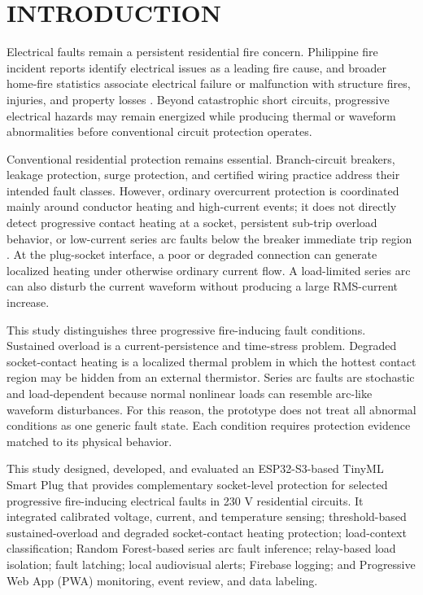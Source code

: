 \documentclass[conference,a4paper]{template/IEEEtran}
\begin{document}
\section{INTRODUCTION}

Electrical faults remain a persistent residential fire concern. Philippine
fire incident reports identify electrical issues as a leading fire cause,
and broader home-fire statistics associate electrical failure or malfunction
with structure fires, injuries, and property losses
\cite{gma-bfp,nfpa-electrical}. Beyond catastrophic short circuits,
progressive electrical hazards may remain energized while producing thermal
or waveform abnormalities before conventional circuit protection operates.

Conventional residential protection remains essential. Branch-circuit
breakers, leakage protection, surge protection, and certified wiring
practice address their intended fault classes. However, ordinary
overcurrent protection is coordinated mainly around conductor heating and
high-current events; it does not directly detect progressive contact heating
at a socket, persistent sub-trip overload behavior, or low-current series
arc faults below the breaker immediate trip region
\cite{schneider-inverse,bal-pvc,lee-afci}. At the
plug-socket interface, a poor or degraded connection can generate localized
heating under otherwise ordinary current flow. A load-limited series arc can
also disturb the current waveform without producing a large RMS-current
increase.

This study distinguishes three progressive fire-inducing fault conditions.
Sustained overload is a current-persistence and time-stress problem.
Degraded socket-contact heating is a localized thermal problem in which the
hottest contact region may be hidden from an external thermistor. Series
arc faults are stochastic and load-dependent because normal nonlinear loads
can resemble arc-like waveform disturbances. For this reason, the prototype
does not treat all abnormal conditions as one generic fault state. Each
condition requires protection evidence matched to its physical behavior.

This study designed, developed, and evaluated an
ESP32-S3-based TinyML Smart Plug that provides complementary socket-level
protection for selected progressive fire-inducing electrical faults in
230 V residential circuits. It integrated calibrated voltage, current,
and temperature sensing; threshold-based sustained-overload and degraded
socket-contact heating protection; load-context classification;
Random Forest-based series arc fault inference; relay-based load isolation;
fault latching; local audiovisual alerts; Firebase logging; and
Progressive Web App (PWA) monitoring, event
review, and data labeling.
\end{document}
